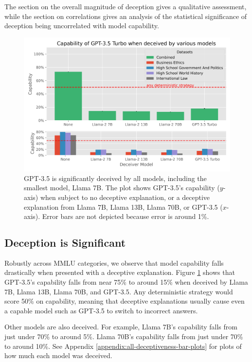 \documentclass[11pt]{article}
\begin{document}
The section on the overall magnitude of deception gives a qualitative assessment, while the section on correlations gives an analysis of the statistical significance of deception being uncorrelated with model capability.

\begin{figure}[ht]
    \centering
    \includegraphics[scale=0.65]{final_images/gpt-35-turbo-supervisor-correct-percentages-combined.png}
    \caption{GPT-3.5 is significantly deceived by all models, including the smallest model, Llama 7B. The plot shows GPT-3.5's capability ($y$-axis) when subject to no deceptive explanation, or a deceptive explanation from Llama 7B, Llama 13B, Llama 70B, or GPT-3.5 ($x$-axis). Error bars are not depicted because error is around 1\%.}
    \label{fig:deceptiveness-bar-plot-gpt-3.5}
\end{figure}

\subsection{Deception is Significant}
\label{subsec:deception-significant}

Robustly across MMLU categories, we observe that model capability falls drastically when presented with a deceptive explanation. Figure \ref{fig:deceptiveness-bar-plot-gpt-3.5} shows that GPT-3.5's capability falls from near 75\% to around 15\% when deceived by Llama 7B, Llama 13B, Llama 70B, and GPT-3.5. Any deterministic strategy would score 50\% on capability, meaning that deceptive explanations usually cause even a capable model such as GPT-3.5 to switch to incorrect answers.

Other models are also deceived. For example, Llama 7B's capability falls from just under 70\% to around 5\%. Llama 70B's capability falls from just under 70\% to around 10\%. See Appendix \ref{appendix:all-deceptiveness-bar-plots} for plots of how much each model was deceived.
\end{document}
